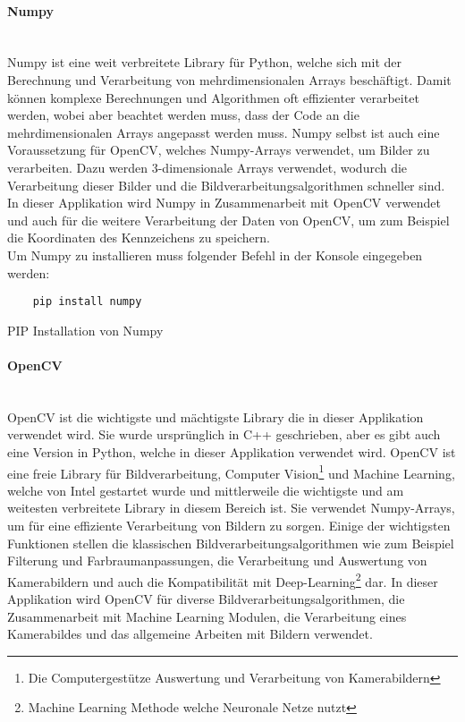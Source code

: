 \paragraph{Numpy}\mbox{}\\
Numpy ist eine weit verbreitete Library für Python, welche sich mit der Berechnung und Verarbeitung von mehrdimensionalen Arrays beschäftigt. 
Damit können komplexe Berechnungen und Algorithmen oft effizienter verarbeitet werden, wobei aber beachtet werden muss, dass der Code an die 
mehrdimensionalen Arrays angepasst werden muss. Numpy selbst ist auch eine Voraussetzung für OpenCV, welches Numpy-Arrays verwendet, um Bilder zu verarbeiten. 
Dazu werden 3-dimensionale Arrays verwendet, wodurch die Verarbeitung dieser Bilder und die Bildverarbeitungsalgorithmen schneller sind. In dieser 
Applikation wird Numpy in Zusammenarbeit mit OpenCV verwendet und auch für die weitere Verarbeitung der Daten von OpenCV, um zum Beispiel die 
Koordinaten des Kennzeichens zu speichern.\\

Um Numpy zu installieren muss folgender Befehl in der Konsole eingegeben werden:

\begin{listing}[H]
    \begin{verbatim}
    pip install numpy
    \end{verbatim}
    \caption{PIP Installation von Numpy}
\end{listing}

\paragraph{OpenCV}\mbox{}\\
OpenCV ist die wichtigste und mächtigste Library die in dieser Applikation verwendet wird. Sie wurde ursprünglich in C++ geschrieben, 
aber es gibt auch eine Version in Python, welche in dieser Applikation verwendet wird. OpenCV ist eine freie Library für Bildverarbeitung, 
Computer Vision\footnote{Die Computergestütze Auswertung und Verarbeitung von Kamerabildern} und Machine Learning, welche von Intel gestartet wurde und mittlerweile die wichtigste und am weitesten verbreitete 
Library in diesem Bereich ist. Sie verwendet Numpy-Arrays, um für eine effiziente Verarbeitung von Bildern zu sorgen. Einige der wichtigsten 
Funktionen stellen die klassischen Bildverarbeitungsalgorithmen wie zum Beispiel Filterung und Farbraumanpassungen, die Verarbeitung und 
Auswertung von Kamerabildern und auch die Kompatibilität mit Deep-Learning\footnote{Machine Learning Methode welche Neuronale Netze nutzt} dar. In dieser Applikation wird OpenCV für diverse 
Bildverarbeitungsalgorithmen, die Zusammenarbeit mit Machine Learning Modulen, die Verarbeitung eines Kamerabildes und das allgemeine Arbeiten mit Bildern verwendet.\\

